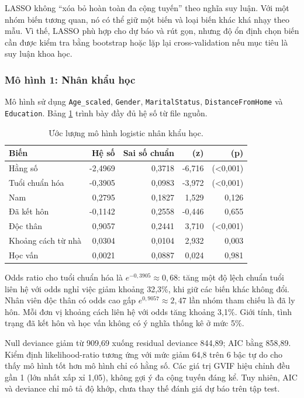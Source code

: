 LASSO không ``xóa bỏ hoàn toàn đa cộng tuyến'' theo nghĩa suy luận. Với
một nhóm biến tương quan, nó có thể giữ một biến và loại biến khác khá
nhạy theo mẫu. Vì thế, LASSO phù hợp cho dự báo và rút gọn, nhưng độ ổn
định chọn biến cần được kiểm tra bằng bootstrap hoặc lặp lại cross-validation
nếu mục tiêu là suy luận khoa học.

\subsubsection{Mô hình 1: Nhân khẩu học}

Mô hình sử dụng \texttt{Age\_scaled}, \texttt{Gender},
\texttt{MaritalStatus}, \texttt{DistanceFromHome} và
\texttt{Education}. Bảng \ref{tab:hr-model1} trình bày đầy đủ hệ số từ
file nguồn.

\begin{table}[H]
\centering
\small
\caption{Ước lượng mô hình logistic nhân khẩu học.}
\label{tab:hr-model1}
\begin{tabular}{lrrrr}
\toprule
Biến & Hệ số & Sai số chuẩn & (z) & (p)\\
\midrule
Hằng số & -2,4969 & 0,3718 & -6,716 & (<0,001)\\
Tuổi chuẩn hóa & -0,3905 & 0,0983 & -3,972 & (<0,001)\\
Nam & 0,2795 & 0,1827 & 1,529 & 0,126\\
Đã kết hôn & -0,1142 & 0,2558 & -0,446 & 0,655\\
Độc thân & 0,9057 & 0,2441 & 3,710 & (<0,001)\\
Khoảng cách từ nhà & 0,0304 & 0,0104 & 2,932 & 0,003\\
Học vấn & 0,0021 & 0,0887 & 0,024 & 0,981\\
\bottomrule
\end{tabular}
\end{table}

Odds ratio cho tuổi chuẩn hóa là \(e^{-0,3905}\approx0,68\): tăng một
độ lệch chuẩn tuổi liên hệ với odds nghỉ việc giảm khoảng 32,3\%, khi
giữ các biến khác không đổi. Nhân viên độc thân có odds cao gấp
\(e^{0,9057}\approx2,47\) lần nhóm tham chiếu là đã ly hôn. Mỗi đơn vị
khoảng cách liên hệ với odds tăng khoảng 3,1\%. Giới tính, tình
trạng đã kết hôn và học vấn không có ý nghĩa thống kê ở mức 5\%.

Null deviance giảm từ 909,69 xuống residual deviance 844,89; AIC bằng
858,89. Kiểm định likelihood-ratio tương ứng với mức giảm 64,8 trên 6
bậc tự do cho thấy mô hình tốt hơn mô hình chỉ có hằng số. Các giá trị
GVIF hiệu chỉnh đều gần 1 (lớn nhất xấp xỉ 1,05), không gợi ý đa cộng
tuyến đáng kể. Tuy nhiên, AIC và deviance chỉ mô tả độ khớp, chưa thay
thế đánh giá dự báo trên tập test.

